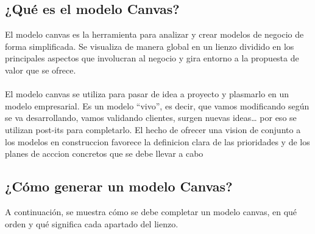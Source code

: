 \documentclass[%
 reprint,
 amsmath,amssymb,
 aps,
]{revtex4-1}
\begin{document}
\subsection{¿Qué es el modelo Canvas?}
El modelo canvas es la herramienta para analizar y crear modelos de negocio de forma simplificada. Se visualiza de manera global en un lienzo dividido en los principales aspectos que involucran al negocio y gira entorno a la propuesta de valor que se ofrece.\\\\
El modelo canvas se utiliza para pasar de idea a proyecto y plasmarlo en un modelo empresarial. Es un modelo “vivo”, es decir, que vamos modificando según se va desarrollando, vamos validando clientes, surgen nuevas ideas… por eso se utilizan post-its para completarlo.
El hecho de ofrecer una vision de conjunto a los modelos en construccion favorece la definicion clara de las prioridades y de los planes de acccion concretos que se debe llevar a cabo\cite{3}

\subsection{¿Cómo generar un modelo Canvas?}
A continuación, se muestra cómo se debe completar un modelo canvas, en qué orden y qué significa cada apartado del lienzo.\\\\
\end{document}
